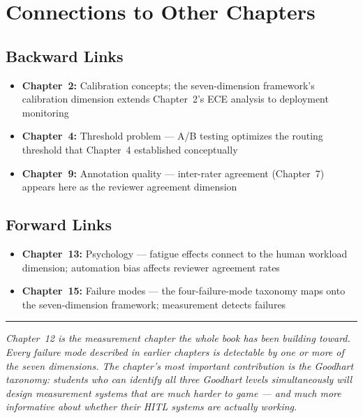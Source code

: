 \section{Connections to Other Chapters}

\subsection{Backward Links}
\begin{itemize}
    \item \textbf{Chapter~2:} Calibration concepts; the seven-dimension framework's calibration dimension extends Chapter~2's ECE analysis to deployment monitoring
    \item \textbf{Chapter~4:} Threshold problem --- A/B testing optimizes the routing threshold that Chapter~4 established conceptually
    \item \textbf{Chapter~9:} Annotation quality --- inter-rater agreement (Chapter~7) appears here as the reviewer agreement dimension
\end{itemize}

\subsection{Forward Links}
\begin{itemize}
    \item \textbf{Chapter~13:} Psychology --- fatigue effects connect to the human workload dimension; automation bias affects reviewer agreement rates
    \item \textbf{Chapter~15:} Failure modes --- the four-failure-mode taxonomy maps onto the seven-dimension framework; measurement detects failures
\end{itemize}

\bigskip
\begin{center}
\rule{0.5\textwidth}{0.4pt}
\end{center}
\bigskip

\noindent\textit{Chapter~12 is the measurement chapter the whole book has been building toward. Every failure mode described in earlier chapters is detectable by one or more of the seven dimensions. The chapter's most important contribution is the Goodhart taxonomy: students who can identify all three Goodhart levels simultaneously will design measurement systems that are much harder to game --- and much more informative about whether their HITL systems are actually working.}
